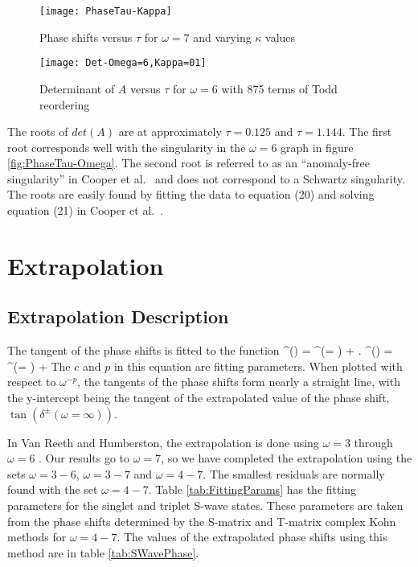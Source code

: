 \documentclass[Dissertation.tex]{subfiles}
\begin{document}
\begin{figure}[H]
	\centering
	\texttt{[image: PhaseTau-Kappa]}
	\caption{Phase shifts versus $\tau$ for $\omega = 7$ and varying $\kappa$ values}
	\label{fig:PhaseTau-Kappa}
\end{figure}

\begin{figure}[H]
	\centering
	\texttt{[image: Det-Omega=6,Kappa=01]}
	\caption{Determinant of $A$ versus $\tau$ for $\omega = 6$ with 875 terms of Todd reordering}
	\label{fig:Det-Omega=6,Kappa=01}
\end{figure}

The roots of $det(A)$ are at approximately $\tau = 0.125$ and $\tau = 1.144$. The first root corresponds well with the singularity in the $\omega = 6$ graph in figure \ref{fig:PhaseTau-Omega}. The second root is referred to as an ``anomaly-free singularity'' in Cooper et al.\ \cite{Cooper2009} and does not correspond to a Schwartz singularity. The roots are easily found by fitting the data to equation (20) and solving equation (21) in Cooper et al.\ \cite{Cooper2009}.


\section{Extrapolation}
\label{sec:Extrapolation}

\subsection{Extrapolation Description}

The tangent of the phase shifts is fitted to the function
\beq
\label{eq:PhaseExtrap}
\tan \delta^\pm(\omega) = \tan \delta^\pm(\omega = \infty) + .
\eeq
\beq
\label{eq:PhaseExtrap2}
\lambda^\pm(\omega) = \lambda^\pm(\omega = \infty) + 
\eeq
The $c$ and $p$ in this equation are fitting parameters. When plotted with respect to $\omega^{-p}$, the tangents of the phase shifts form nearly a straight line, with the y-intercept being the tangent of the extrapolated value of the phase shift, $\tan(\delta^\pm(\omega = \infty))$.

In Van Reeth and Humberston, the extrapolation is done using $\omega = 3$ through $\omega = 6$ \cite{VanReeth2003}. Our results go to $\omega = 7$, so we have completed the extrapolation using the sets $\omega = 3-6$, $\omega = 3-7$ and $\omega = 4-7$. The smallest residuals are normally found with the set $\omega = 4-7$. Table \ref{tab:FittingParams} has the fitting parameters for the singlet and triplet S-wave states. These parameters are taken from the phase shifts determined by the S-matrix and T-matrix complex Kohn methods for $\omega = 4-7$. The values of the extrapolated phase shifts using this method are in table \ref{tab:SWavePhase}.
\end{document}

